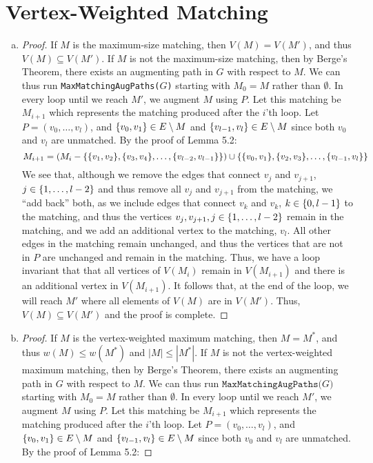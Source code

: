 \documentclass[11pt]{scrartcl}
\theoremstyle{dotlessP}
\theoremstyle{dotlessN}
\DeclarePairedDelimiter\set{\{}{\}}
\newcommand{\unite}{\cup}
\begin{document}
\section{Vertex-Weighted Matching}
\begin{enumerate}[(a)]
\item		\begin{proof}
			If $M$ is the maximum-size matching, then $V(M) = V(M')$, and thus  $V(M) \subseteq V(M')$. If $M$ is not the maximum-size matching, then by Berge's Theorem, there exists an augmenting path in $G$ with respect to $M$. We can thus run \texttt{MaxMatchingAugPaths($G$)} starting with $M_0 = M$ rather than $\emptyset$. In every loop until we reach $M'$, we augment $M$ using $P$. Let this matching be $M_{i+1}$ which represents the matching produced after the $i$'th loop. Let $P = (v_0, \dots, v_l)$, and $\set*{v_0, v_1} \in E \setminus M$ and $\set*{v_{l-1}, v_l} \in E \setminus M$ since both  $v_0$ and $v_l$ are unmatched. By the proof of Lemma 5.2:
			\[
				M_{i+1} = (M_i - \set*{\set*{v_1, v_2}, \set*{v_3,v_4}, \dots, \set*{v_{l-2}, v_{l-1}}}) \unite \set*{\set*{v_0, v_1}, \set*{v_2, v_3}, \dots, \set*{v_{l-1}, v_{l}}}
			\]
			We see that, although we remove the edges that connect $v_{j}$ and $v_{j+1}$, $j \in \set*{1, \dots, l-2}$ and thus remove all $v_j$ and $v_{j+1}$ from the matching, we ``add back'' both, as we include edges that connect $v_{k}$ and $v_{k}$, $k \in \set*{0, l-1}$ to the matching, and thus the vertices $v_j, v_{j+1}, j \in \set*{1, \dots, l-2}$ remain in the matching, and we add an additional vertex to the matching, $v_l$. All other edges in the matching remain unchanged, and thus the vertices that are not in $P$ are unchanged and remain in the matching. Thus, we have a loop invariant that that all vertices of $V(M_i)$ remain in $V(M_{i+1})$ and there is an additional vertex in $V(M_{i+1})$. It follows that, at the end of the loop, we will reach $M'$ where all elements of $V(M)$ are in $V(M')$. Thus, $V(M) \subseteq V(M')$ and the proof is complete.
		\end{proof}
	\item 
		\begin{proof}
			If $M$ is the vertex-weighted maximum matching, then $M = M^*$, and thus $w(M) \leq w(M^*)$ and $|M| \leq |M^*|$. If $M$ is not the vertex-weighted maximum matching, then by Berge's Theorem, there exists an augmenting path in $G$ with respect to $M$. We can thus run $\texttt{MaxMatchingAugPaths($G$)}$ starting with $M_0 = M$ rather than $\emptyset$. In every loop until we reach $M'$, we augment $M$ using $P$. Let this matching be $M_{i+1}$ which represents the matching produced after the $i$'th loop. Let $P = (v_0, \dots, v_l)$, and $\set*{v_0, v_1} \in E \setminus M$ and $\set*{v_{l-1}, v_l} \in E \setminus M$ since both  $v_0$ and $v_l$ are unmatched. By the proof of Lemma 5.2:

\end{proof}
\end{enumerate}
\end{document}
